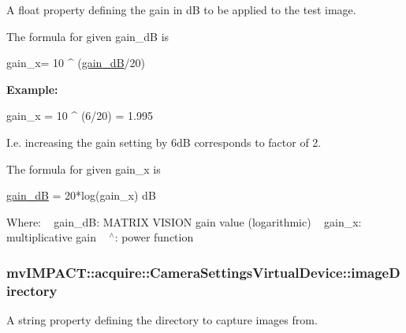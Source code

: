 A float property defining the gain in d\+B to be applied to the test image. 

The formula for given {\ttfamily gain\+\_\+d\+B} is 
\begin{DoxyCode}
gain\_x= 10 ^ (\hyperlink{classmv_i_m_p_a_c_t_1_1acquire_1_1_camera_settings_virtual_device_a4337e2da0e836c79f18b619dc68d8681}{gain\_dB}/20)
\end{DoxyCode}


{\bfseries Example\+:} 


\begin{DoxyCode}
gain\_x = 10 ^ (6/20) = 1.995
\end{DoxyCode}


I.\+e. increasing the gain setting by 6d\+B corresponds to factor of 2.

The formula for given gain\+\_\+x is 
\begin{DoxyCode}
\hyperlink{classmv_i_m_p_a_c_t_1_1acquire_1_1_camera_settings_virtual_device_a4337e2da0e836c79f18b619dc68d8681}{gain\_dB} = 20*log(gain\_x) dB
\end{DoxyCode}


Where\+: ~\newline
{\ttfamily gain\+\_\+d\+B\+:} M\+A\+T\+R\+I\+X V\+I\+S\+I\+O\+N gain value (logarithmic) ~\newline
{\ttfamily gain\+\_\+x\+:} multiplicative gain ~\newline
{\ttfamily $^\wedge$}\+: power function ~\newline
\hypertarget{classmv_i_m_p_a_c_t_1_1acquire_1_1_camera_settings_virtual_device_a399ecae9be05ea1c5bc3f73565fb7ea5}{
\subsubsection[{image\+Directory}]{ mv\+I\+M\+P\+A\+C\+T\+::acquire\+::\+Camera\+Settings\+Virtual\+Device\+::image\+Directory}}\label{classmv_i_m_p_a_c_t_1_1acquire_1_1_camera_settings_virtual_device_a399ecae9be05ea1c5bc3f73565fb7ea5}


A string property defining the directory to capture images from. 


